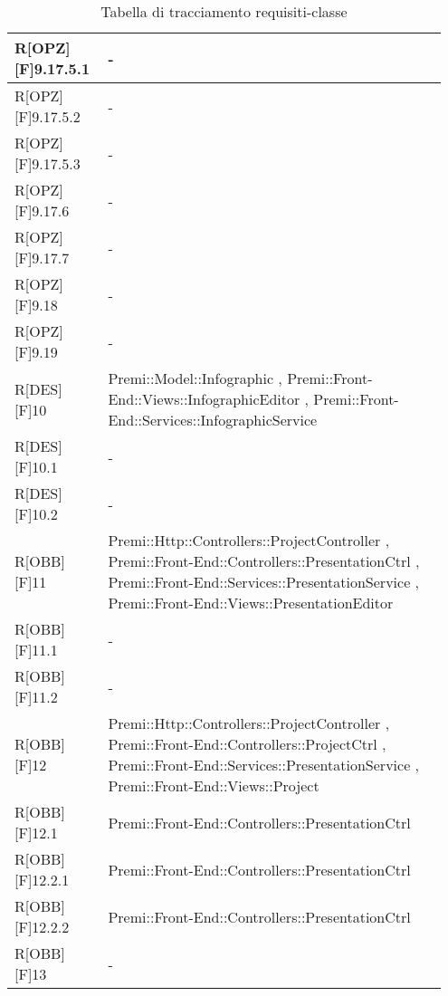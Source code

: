\begin{table}[h]
	\begin{center}
		\begin{tabular}{|p{0.2\linewidth}|p{0.75\linewidth}|}
			\toprule
			R[OPZ][F]9.17.5.1 & -\\
		\midrule
			R[OPZ][F]9.17.5.2 & -\\
		\midrule
			R[OPZ][F]9.17.5.3 & -\\
		\midrule
			R[OPZ][F]9.17.6 & -\\
		\midrule
			R[OPZ][F]9.17.7 & -\\
		\midrule
			R[OPZ][F]9.18 & -\\
		\midrule
			R[OPZ][F]9.19 & -\\
		\midrule
			R[DES][F]10 & Premi::Model::Infographic , Premi::Front-End::Views::InfographicEditor , Premi::Front-End::Services::InfographicService\\
		\midrule
			R[DES][F]10.1 & -\\
		\midrule
			R[DES][F]10.2 & -\\
		\midrule
			R[OBB][F]11 & Premi::Http::Controllers::ProjectController , Premi::Front-End::Controllers::PresentationCtrl , Premi::Front-End::Services::PresentationService , Premi::Front-End::Views::PresentationEditor\\
		\midrule
			R[OBB][F]11.1 & -\\
		\midrule
			R[OBB][F]11.2 & -\\
		\midrule
			R[OBB][F]12 & Premi::Http::Controllers::ProjectController , Premi::Front-End::Controllers::ProjectCtrl , Premi::Front-End::Services::PresentationService , Premi::Front-End::Views::Project\\
		\midrule
			R[OBB][F]12.1 & Premi::Front-End::Controllers::PresentationCtrl\\
		\midrule
			R[OBB][F]12.2.1 & Premi::Front-End::Controllers::PresentationCtrl\\
		\midrule
			R[OBB][F]12.2.2 & Premi::Front-End::Controllers::PresentationCtrl\\
		\midrule
			R[OBB][F]13 & -\\
			\bottomrule
		\end{tabular}
	\end{center}
	\caption{Tabella di tracciamento requisiti-classe}
\end{table}
